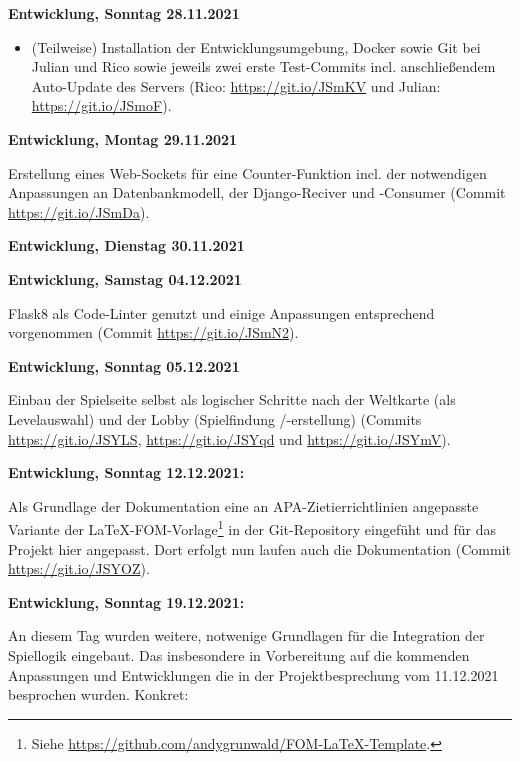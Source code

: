 {            \textbf{Entwicklung, Sonntag 28.11.2021}

            \begin{itemize}
                \item (Teilweise) Installation der Entwicklungsumgebung, Docker sowie Git bei Julian und Rico sowie jeweils zwei erste Test-Commits incl. anschließendem Auto-Update des Servers (Rico: \url{https://git.io/JSmKV} und Julian: \url{https://git.io/JSmoF}).
            \end{itemize}



            \textbf{Entwicklung, Montag 29.11.2021}

            Erstellung eines Web-Sockets für eine Counter-Funktion incl. der notwendigen Anpassungen an Datenbankmodell, der Django-Reciver und -Consumer (Commit \url{https://git.io/JSmDa}).



            \textbf{Entwicklung, Dienstag 30.11.2021}




            \textbf{Entwicklung, Samstag 04.12.2021}

            Flask8 als Code-Linter genutzt und einige Anpassungen entsprechend vorgenommen (Commit \url{https://git.io/JSmN2}).


            \textbf{Entwicklung, Sonntag 05.12.2021}

            Einbau der Spielseite selbst als logischer Schritte nach der Weltkarte (als Levelauswahl) und der Lobby (Spielfindung /-erstellung) (Commits \url{https://git.io/JSYLS}, \url{https://git.io/JSYqd} und \url{https://git.io/JSYmV}).



            \textbf{Entwicklung, Sonntag 12.12.2021:}

            Als Grundlage der Dokumentation eine an APA-Zietierrichtlinien angepasste Variante der LaTeX-FOM-Vorlage\footnote{Siehe \url{https://github.com/andygrunwald/FOM-LaTeX-Template}.} in der Git-Repository eingefüht und für das Projekt hier angepasst. Dort erfolgt nun laufen auch die Dokumentation (Commit \url{https://git.io/JSYOZ}). 



            \textbf{Entwicklung, Sonntag 19.12.2021:}

            An diesem Tag wurden weitere, notwenige Grundlagen für die Integration der Spiellogik eingebaut. Das insbesondere in Vorbereitung auf die kommenden Anpassungen und Entwicklungen die in der Projektbesprechung vom 11.12.2021 besprochen wurden. 
            Konkret: 

}
